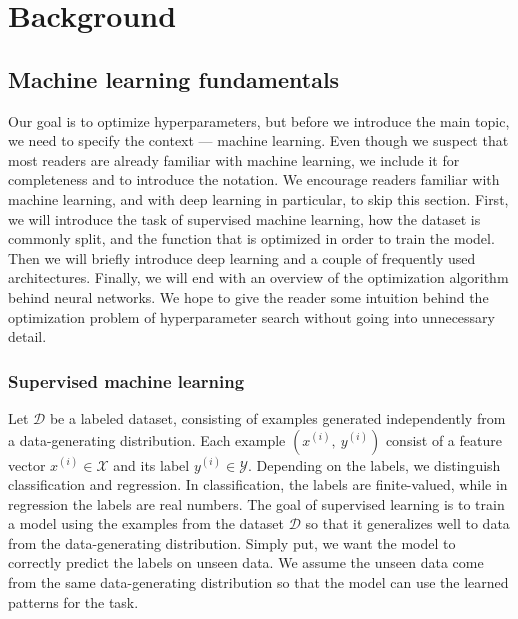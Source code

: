 \chapter{Background}

\label{chap:refs}

\section{Machine learning fundamentals}

Our goal is to optimize hyperparameters, but before we introduce the main topic, we need to specify the context --- machine learning. Even though we suspect that most readers are already familiar with machine learning, we include it for completeness and to introduce the notation. We encourage readers familiar with machine learning, and with deep learning in particular, to skip this section. First, we will introduce the task of supervised machine learning, how the dataset is commonly split, and the function that is optimized in order to train the model. Then we will briefly introduce deep learning and a couple of frequently used architectures. Finally, we will end with an overview of the optimization algorithm behind neural networks. We hope to give the reader some intuition behind the optimization problem of hyperparameter search without going into unnecessary detail.






\subsection{Supervised machine learning}
Let $\mathcal{D}$ be a labeled dataset, consisting of examples generated independently from a data-generating distribution. Each example $(x^{(i)}, \  y^{(i)})$ consist of a feature vector $x^{(i)}\in \mathcal{X}$ and its label $y^{(i)}\in \mathcal{Y}$. Depending on the labels, we distinguish classification and regression. In classification, the labels are finite-valued, while in regression the labels are real numbers. The goal of supervised learning is to train a model using the examples from the dataset $\mathcal{D}$ so that it generalizes well to data from the data-generating distribution. Simply put, we want the model to correctly predict the labels on unseen data. We assume the unseen data come from the same data-generating distribution so that the model can use the learned patterns for the task.  %

